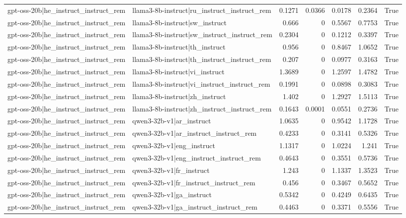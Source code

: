 \begin{table}
\begin{tabular}{l l r r r r l}
gpt-oss-20b|he_instruct_instruct_rem & llama3-8b-instruct|ru_instruct_instruct_rem & 0.1271 & 0.0366 & 0.0178 & 0.2364 & True \\
gpt-oss-20b|he_instruct_instruct_rem & llama3-8b-instruct|sw_instruct & 0.666 & 0 & 0.5567 & 0.7753 & True \\
gpt-oss-20b|he_instruct_instruct_rem & llama3-8b-instruct|sw_instruct_instruct_rem & 0.2304 & 0 & 0.1212 & 0.3397 & True \\
gpt-oss-20b|he_instruct_instruct_rem & llama3-8b-instruct|th_instruct & 0.956 & 0 & 0.8467 & 1.0652 & True \\
gpt-oss-20b|he_instruct_instruct_rem & llama3-8b-instruct|th_instruct_instruct_rem & 0.207 & 0 & 0.0977 & 0.3163 & True \\
gpt-oss-20b|he_instruct_instruct_rem & llama3-8b-instruct|vi_instruct & 1.3689 & 0 & 1.2597 & 1.4782 & True \\
gpt-oss-20b|he_instruct_instruct_rem & llama3-8b-instruct|vi_instruct_instruct_rem & 0.1991 & 0 & 0.0898 & 0.3083 & True \\
gpt-oss-20b|he_instruct_instruct_rem & llama3-8b-instruct|zh_instruct & 1.402 & 0 & 1.2927 & 1.5113 & True \\
gpt-oss-20b|he_instruct_instruct_rem & llama3-8b-instruct|zh_instruct_instruct_rem & 0.1643 & 0.0001 & 0.0551 & 0.2736 & True \\
gpt-oss-20b|he_instruct_instruct_rem & qwen3-32b-v1|ar_instruct & 1.0635 & 0 & 0.9542 & 1.1728 & True \\
gpt-oss-20b|he_instruct_instruct_rem & qwen3-32b-v1|ar_instruct_instruct_rem & 0.4233 & 0 & 0.3141 & 0.5326 & True \\
gpt-oss-20b|he_instruct_instruct_rem & qwen3-32b-v1|eng_instruct & 1.1317 & 0 & 1.0224 & 1.241 & True \\
gpt-oss-20b|he_instruct_instruct_rem & qwen3-32b-v1|eng_instruct_instruct_rem & 0.4643 & 0 & 0.3551 & 0.5736 & True \\
gpt-oss-20b|he_instruct_instruct_rem & qwen3-32b-v1|fr_instruct & 1.243 & 0 & 1.1337 & 1.3523 & True \\
gpt-oss-20b|he_instruct_instruct_rem & qwen3-32b-v1|fr_instruct_instruct_rem & 0.456 & 0 & 0.3467 & 0.5652 & True \\
gpt-oss-20b|he_instruct_instruct_rem & qwen3-32b-v1|ga_instruct & 0.5342 & 0 & 0.4249 & 0.6435 & True \\
gpt-oss-20b|he_instruct_instruct_rem & qwen3-32b-v1|ga_instruct_instruct_rem & 0.4463 & 0 & 0.3371 & 0.5556 & True \\

\end{tabular}
\end{table}
